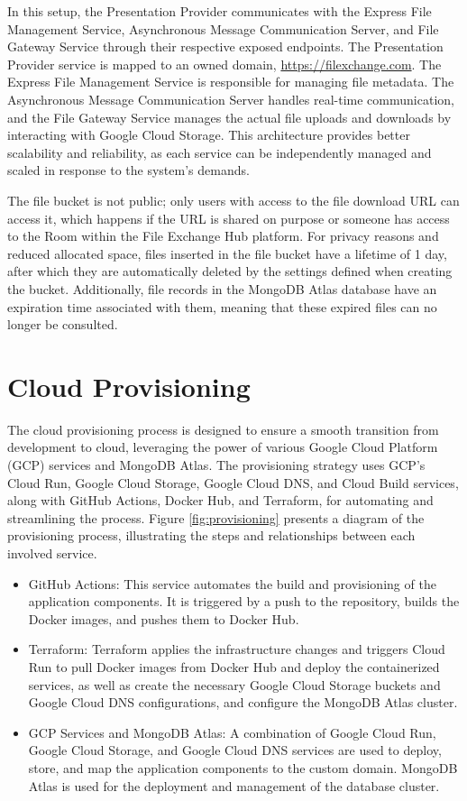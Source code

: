 \documentclass[a4paper,fleqn]{cas-sc}
\begin{document}
In this setup, the Presentation Provider communicates with the Express File Management Service, Asynchronous Message Communication Server, and File Gateway Service through their respective exposed endpoints. The Presentation Provider service is mapped to an owned domain, \url{https://filexchange.com}. The Express File Management Service is responsible for managing file metadata. The Asynchronous Message Communication Server handles real-time communication, and the File Gateway Service manages the actual file uploads and downloads by interacting with Google Cloud Storage. This architecture provides better scalability and reliability, as each service can be independently managed and scaled in response to the system's demands.

The file bucket is not public; only users with access to the file download URL can access it, which happens if the URL is shared on purpose or someone has access to the Room within the File Exchange Hub platform. For privacy reasons and reduced allocated space, files inserted in the file bucket have a lifetime of 1 day, after which they are automatically deleted by the settings defined when creating the bucket. Additionally, file records in the MongoDB Atlas database have an expiration time associated with them, meaning that these expired files can no longer be consulted.

\section{Cloud Provisioning} \label{sec:provisioning}

The cloud provisioning process is designed to ensure a smooth transition from development to cloud, leveraging the power of various Google Cloud Platform (GCP) services and MongoDB Atlas. The provisioning strategy uses GCP's Cloud Run, Google Cloud Storage, Google Cloud DNS, and Cloud Build services, along with GitHub Actions, Docker Hub, and Terraform, for automating and streamlining the process. Figure \ref{fig:provisioning} presents a diagram of the provisioning process, illustrating the steps and relationships between each involved service.

\begin{itemize}
\item GitHub Actions: This service automates the build and provisioning of the application components. It is triggered by a push to the repository, builds the Docker images, and pushes them to Docker Hub.
\item Terraform: Terraform applies the infrastructure changes and triggers Cloud Run to pull Docker images from Docker Hub and deploy the containerized services, as well as create the necessary Google Cloud Storage buckets and Google Cloud DNS configurations, and configure the MongoDB Atlas cluster.
\item GCP Services and MongoDB Atlas: A combination of Google Cloud Run, Google Cloud Storage, and Google Cloud DNS services are used to deploy, store, and map the application components to the custom domain. MongoDB Atlas is used for the deployment and management of the database cluster.
\end{itemize}
\end{document}
